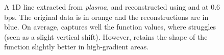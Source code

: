 \begin{figure}[!b]
\vspace{-1.5em}
\centering
{}
\vspace{-0.5em}
\caption{A 1D line extracted from \emph{plasma}, and reconstructed using \sbit and \swav at 0.6 bps.
The original data is in orange and the reconstructions are in blue. On average, \swav captures well
the function values, where \sbit struggles (seen as a slight vertical shift). However, \sbit retains
the shape of the function slightly better in high-gradient areas.}
\label{fig:bit-plane-vs-wavelet-norm-gradient}
\vspace{-1em}
\end{figure}


